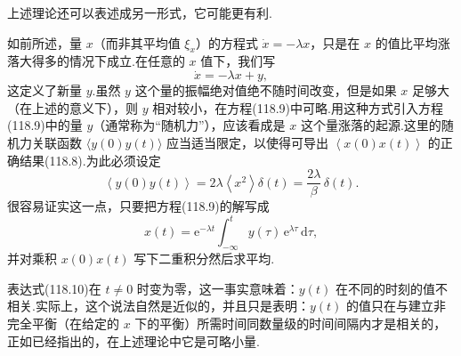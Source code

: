 上述理论还可以表述成另一形式，它可能更有利.

如前所述，量 $x$（而非其平均值 $\xi_{x}$）的方程式 $\dot{x}=-\lambda x$，只是在
$x$ 的值比平均涨落大得多的情况下成立.在任意的 $x$ 值下，我们写
\begin{equation}
  \dot{x}=-\lambda x+y,
\end{equation}
这定义了新量 $y$.虽然 $y$ 这个量的振幅绝对值绝不随时间改变，但是如果 $x$
足够大（在上述的意义下），则 $y$ 相对较小，在方程(118.9)中可略.用这种方式引入方程(118.9)中的量 $y$（通常称为“随机力”），应该看成是 $x$ 这个量涨落的起源.这里的随机力关联函数
$\langle y(0)y(t)\rangle$ 应当适当限定，以使得可导出
$\left\langle x(0)x(t)\right\rangle$ 的正确结果(118.8).为此必须设定
\begin{equation}
  \left\langle y(0)y(t)\right\rangle
  =2\lambda\left\langle x^{2}\right\rangle\delta(t)
  =\frac{2\lambda}{\beta}\,\delta(t).
\end{equation}
很容易证实这一点，只要把方程(118.9)的解写成
\begin{equation*}
  x(t)=\mathrm{e}^{-\lambda t}
  \int_{-\infty}^{t}y(\tau)\,\mathrm{e}^{\lambda\tau}\,\mathrm{d}\tau,
\end{equation*}
并对乘积 $x(0)x(t)$ 写下二重积分然后求平均.

表达式(118.10)在 $t\neq0$ 时变为零，这一事实意味着：$y(t)$
在不同的时刻的值不相关.实际上，这个说法自然是近似的，并且只是表明：$y(t)$
的值只在与建立非完全平衡（在给定的 $x$ 下的平衡）所需时间同数量级的时间间隔内才是相关的，正如已经指出的，在上述理论中它是可略小量.
